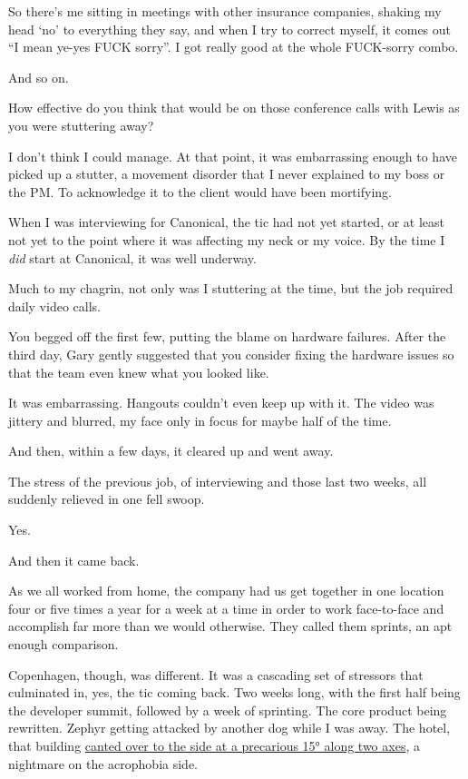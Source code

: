 So there's me sitting in meetings with other insurance companies, shaking my head `no' to everything they say, and when I try to correct myself, it comes out ``I mean ye-yes FUCK sorry''. I got really good at the whole FUCK-sorry combo.

And so on.

\begin{ally}
How effective do you think that would be on those conference calls with Lewis as you were stuttering away?
\end{ally}
I don't think I could manage. At that point, it was embarrassing enough to have picked up a stutter, a movement disorder that I never explained to my boss or the PM. To acknowledge it to the client would have been mortifying.
\newpage

\noindent When I was interviewing for Canonical, the tic had not yet started, or at least not yet to the point where it was affecting my neck or my voice. By the time I \emph{did} start at Canonical, it was well underway.

Much to my chagrin, not only was I stuttering at the time, but the job required daily video calls.

\begin{ally}
You begged off the first few, putting the blame on hardware failures. After the third day, Gary gently suggested that you consider fixing the hardware issues so that the team even knew what you looked like.
\end{ally}
It was embarrassing. Hangouts couldn't even keep up with it. The video was jittery and blurred, my face only in focus for maybe half of the time.

And then, within a few days, it cleared up and went away.

\begin{ally}
The stress of the previous job, of interviewing and those last two weeks, all suddenly relieved in one fell swoop.
\end{ally}
Yes.

\begin{ally}
And then it came back.
\end{ally}
As we all worked from home, the company had us get together in one location four or five times a year for a week at a time in order to work face-to-face and accomplish far more than we would otherwise. They called them sprints, an apt enough comparison.

Copenhagen, though, was different. It was a cascading set of stressors that culminated in, yes, the tic coming back. Two weeks long, with the first half being the developer summit, followed by a week of sprinting. The core product being rewritten. Zephyr getting attacked by another dog while I was away. The hotel, that building \href{/movement/copenhotel.jpg}{canted over to the side at a precarious 15° along two axes}, a nightmare on the acrophobia side.

